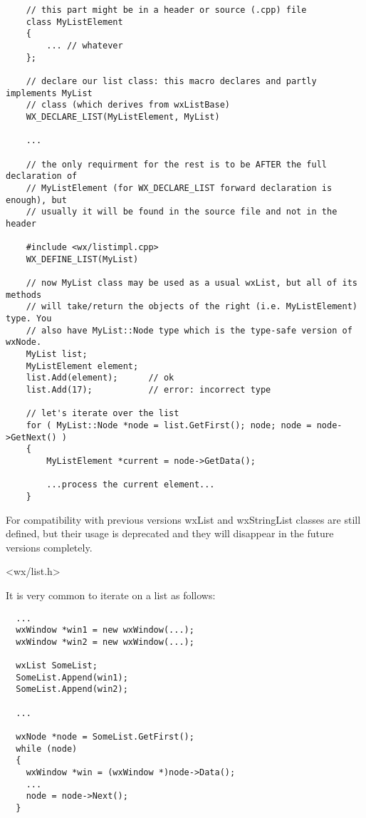 {\small%
\begin{verbatim}
    // this part might be in a header or source (.cpp) file
    class MyListElement
    {
        ... // whatever
    };

    // declare our list class: this macro declares and partly implements MyList
    // class (which derives from wxListBase)
    WX_DECLARE_LIST(MyListElement, MyList)

    ...

    // the only requirment for the rest is to be AFTER the full declaration of
    // MyListElement (for WX_DECLARE_LIST forward declaration is enough), but
    // usually it will be found in the source file and not in the header

    #include <wx/listimpl.cpp>
    WX_DEFINE_LIST(MyList)

    // now MyList class may be used as a usual wxList, but all of its methods
    // will take/return the objects of the right (i.e. MyListElement) type. You
    // also have MyList::Node type which is the type-safe version of wxNode.
    MyList list;
    MyListElement element;
    list.Add(element);      // ok
    list.Add(17);           // error: incorrect type

    // let's iterate over the list
    for ( MyList::Node *node = list.GetFirst(); node; node = node->GetNext() )
    {
        MyListElement *current = node->GetData();

        ...process the current element...
    }
\end{verbatim}
}

For compatibility with previous versions wxList and wxStringList classes are
still defined, but their usage is deprecated and they will disappear in the
future versions completely.




<wx/list.h>


It is very common to iterate on a list as follows:

\begin{verbatim}
  ...
  wxWindow *win1 = new wxWindow(...);
  wxWindow *win2 = new wxWindow(...);

  wxList SomeList;
  SomeList.Append(win1);
  SomeList.Append(win2);

  ...

  wxNode *node = SomeList.GetFirst();
  while (node)
  {
    wxWindow *win = (wxWindow *)node->Data();
    ...
    node = node->Next();
  }
\end{verbatim}

